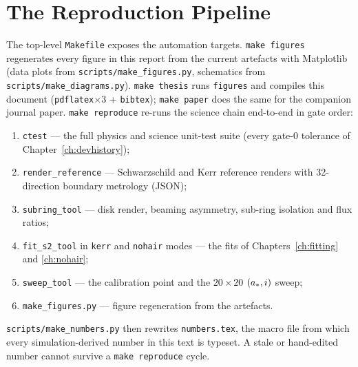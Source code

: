 \chapter{The Reproduction Pipeline}
\label{app:repro}

The top-level \texttt{Makefile} exposes the automation targets.
\texttt{make figures} regenerates every figure in this report from the
current artefacts with Matplotlib (data plots from
\texttt{scripts/make\_figures.py}, schematics from
\texttt{scripts/make\_diagrams.py}). \texttt{make thesis} runs
\texttt{figures} and compiles this document
(\texttt{pdflatex}$\times3$ + \texttt{bibtex}); \texttt{make paper} does
the same for the companion journal paper. \texttt{make reproduce}
re-runs the science chain end-to-end in gate order:
\begin{enumerate}
\item \texttt{ctest} --- the full physics and science unit-test suite
(every gate-0 tolerance of Chapter~\ref{ch:devhistory});
\item \texttt{render\_reference} --- Schwarzschild and Kerr reference
renders with 32-direction boundary metrology (JSON);
\item \texttt{subring\_tool} --- disk render, beaming asymmetry, sub-ring
isolation and flux ratios;
\item \texttt{fit\_s2\_tool} in \texttt{kerr} and \texttt{nohair} modes ---
the fits of Chapters~\ref{ch:fitting} and \ref{ch:nohair};
\item \texttt{sweep\_tool} --- the \sgra{} calibration point and the
$20\times20$ $(a_*,i)$ sweep;
\item \texttt{make\_figures.py} --- figure regeneration from the
artefacts.
\end{enumerate}
\texttt{scripts/make\_numbers.py} then rewrites \texttt{numbers.tex}, the
macro file from which every simulation-derived number in this text is
typeset. A stale or hand-edited number cannot survive a
\texttt{make reproduce} cycle.


